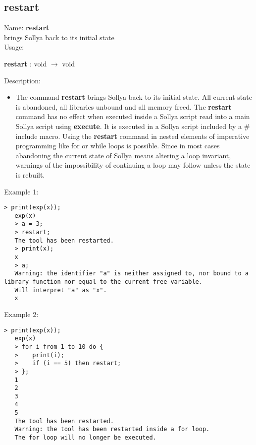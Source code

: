 \subsection{ restart }
\noindent Name: \textbf{restart}\\
brings Sollya back to its initial state\\

\noindent Usage: 
\begin{center}
\textbf{restart} : \textsf{void} $\rightarrow$ \textsf{void}\\
\end{center}
\noindent Description: \begin{itemize}

\item The command \textbf{restart} brings Sollya back to its initial state.  All
   current state is abandoned, all libraries unbound and all memory freed.
   The \textbf{restart} command has no effect when executed inside a Sollya
   script read into a main Sollya script using \textbf{execute}. It is executed
   in a Sollya script included by a $\#$include macro.
   Using the \textbf{restart} command in nested elements of imperative
   programming like for or while loops is possible. Since in most cases
   abandoning the current state of Sollya means altering a loop
   invariant, warnings of the impossibility of continuing a loop may
   follow unless the state is rebuilt.
\end{itemize}
\noindent Example 1: 
\begin{center}\begin{minipage}{14.8cm}\begin{Verbatim}[frame=single]
   > print(exp(x));
   exp(x)
   > a = 3;
   > restart;
   The tool has been restarted.
   > print(x);
   x
   > a;
   Warning: the identifier "a" is neither assigned to, nor bound to a library function nor equal to the current free variable.
   Will interpret "a" as "x".
   x
\end{Verbatim}
\end{minipage}\end{center}
\noindent Example 2: 
\begin{center}\begin{minipage}{14.8cm}\begin{Verbatim}[frame=single]
   > print(exp(x));
   exp(x)
   > for i from 1 to 10 do {
   > 	print(i);
   > 	if (i == 5) then restart;
   > };
   1
   2
   3
   4
   5
   The tool has been restarted.
   Warning: the tool has been restarted inside a for loop.
   The for loop will no longer be executed.
\end{Verbatim}
\end{minipage}\end{center}
